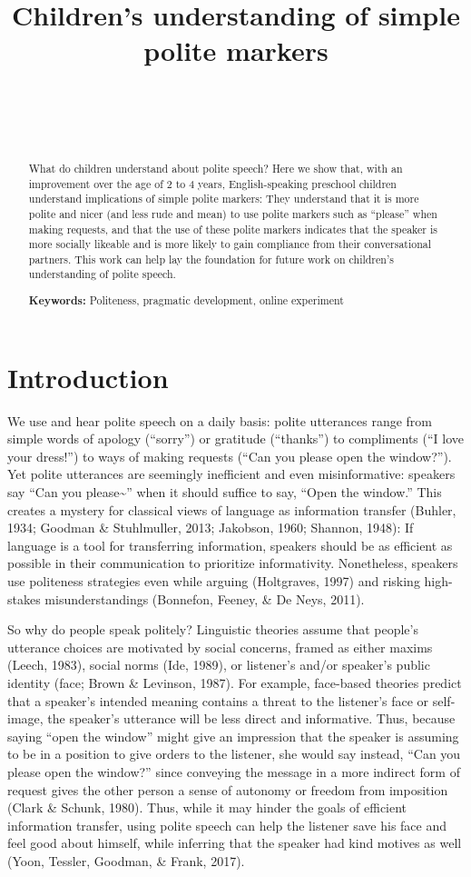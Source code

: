 \documentclass[10pt, letterpaper]{article}
\title{Children's understanding of simple polite markers}
\author{{\large \bf } \\ \texttt{} \\  \\}
\begin{document}
\maketitle

\begin{abstract}
What do children understand about polite speech? Here we show that, with
an improvement over the age of 2 to 4 years, English-speaking preschool
children understand implications of simple polite markers: They
understand that it is more polite and nicer (and less rude and mean) to
use polite markers such as ``please'' when making requests, and that the
use of these polite markers indicates that the speaker is more socially
likeable and is more likely to gain compliance from their conversational
partners. This work can help lay the foundation for future work on
children's understanding of polite speech.

\textbf{Keywords:}
Politeness, pragmatic development, online experiment
\end{abstract}

\section{Introduction}\label{introduction}

We use and hear polite speech on a daily basis: polite utterances range
from simple words of apology (``sorry'') or gratitude (``thanks'') to
compliments (``I love your dress!'') to ways of making requests (``Can
you please open the window?''). Yet polite utterances are seemingly
inefficient and even misinformative: speakers say ``Can you
please\textasciitilde{}'' when it should suffice to say, ``Open the
window.'' This creates a mystery for classical views of language as
information transfer (Buhler, 1934; Goodman \& Stuhlmuller, 2013;
Jakobson, 1960; Shannon, 1948): If language is a tool for transferring
information, speakers should be as efficient as possible in their
communication to prioritize informativity. Nonetheless, speakers use
politeness strategies even while arguing (Holtgraves, 1997) and risking
high-stakes misunderstandings (Bonnefon, Feeney, \& De Neys, 2011).

So why do people speak politely? Linguistic theories assume that
people's utterance choices are motivated by social concerns, framed as
either maxims (Leech, 1983), social norms (Ide, 1989), or listener's
and/or speaker's public identity (face; Brown \& Levinson, 1987). For
example, face-based theories predict that a speaker's intended meaning
contains a threat to the listener's face or self-image, the speaker's
utterance will be less direct and informative. Thus, because saying
``open the window'' might give an impression that the speaker is
assuming to be in a position to give orders to the listener, she would
say instead, ``Can you please open the window?'' since conveying the
message in a more indirect form of request gives the other person a
sense of autonomy or freedom from imposition (Clark \& Schunk, 1980).
Thus, while it may hinder the goals of efficient information transfer,
using polite speech can help the listener save his face and feel good
about himself, while inferring that the speaker had kind motives as well
(Yoon, Tessler, Goodman, \& Frank, 2017).
\end{document}

